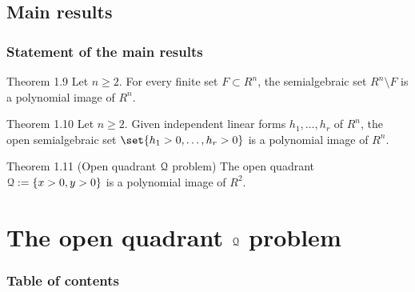 \documentclass{beamer}
\begin{document}
\subsection{Main results}
\begin{frame}
\frametitle{Statement of the main results}

\begin{block}{Theorem 1.9}
Let $n\ge2$. For every finite set $F\subset R^n$, the semialgebraic set $R^n\setminus F$ is a polynomial image of $R^n$.
\end{block} 
\vspace{0.4cm}

\begin{block}{Theorem 1.10}
Let $n\ge 2$. Given independent linear forms $h_1,\dots,h_r$ of $R^n$, the open semialgebraic set $\set{h_1>0,\dots,h_r>0}$ is a polynomial image of $R^n$.
\end{block} 
\vspace{0.4cm}

\begin{block}{Theorem 1.11 (Open quadrant $\mathcal{Q}$ problem)}
The open quadrant $\mathcal{Q}:=\{x>0,y>0\}$ is a polynomial image of $R^2$.
\end{block}
\end{frame}

\section{The open quadrant $\mathcal{Q}$ problem}
\begin{frame}
\frametitle{Table of contents}
\tableofcontents[currentsection]
\end{frame} 
\end{document}
